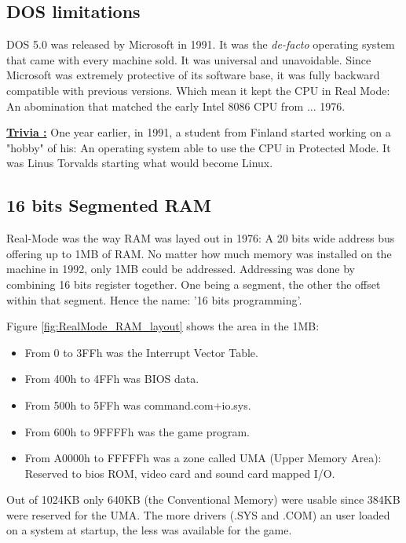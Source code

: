 \documentclass[book.tex]{subfiles}
\begin{document}
  \subsection{DOS limitations}
DOS 5.0 was released by Microsoft in 1991. It was the \emph{de-facto} operating system that came with every machine sold. It was universal and unavoidable. Since Microsoft was extremely protective of its software base, it was fully backward compatible with previous versions. Which mean it kept the CPU in Real Mode: An abomination that matched the early 
Intel 8086 CPU from ... 1976.

\bigskip

 \textbf{\underline{Trivia :}} One year earlier, in 1991, a student from Finland started working on a "hobby" of his: An operating system able to use the CPU in Protected Mode. It was Linus Torvalds starting what would become Linux.



  \subsection{16 bits Segmented RAM}
  Real-Mode was the way RAM was layed out in 1976: A 20 bits wide address bus offering up to 1MB of RAM. No matter how much memory was installed on the machine in 1992, only 1MB could be addressed. Addressing was done by combining 16 bits register together. One being a segment, the other the offset within that segment. Hence the name: '16 bits programming'.

  \bigskip

Figure \ref{fig:RealMode_RAM_layout} shows the area in the 1MB:
  \begin{itemize}
  

\item From 0 to 3FFh was the Interrupt Vector Table.
\item From 400h to 4FFh was BIOS data.
\item From 500h to 5FFh was command.com+io.sys.
\item From 600h to 9FFFFh  was the game program. 
\item From A0000h to FFFFFh was a zone called UMA (Upper Memory Area): Reserved to bios ROM, video card and sound card mapped I/O.
\end{itemize}

Out of 1024KB only 640KB (the Conventional Memory) were usable since 384KB were reserved for the UMA. The more drivers (.SYS and .COM) an user loaded on a system at startup, the less was available for the game.
\end{document}
